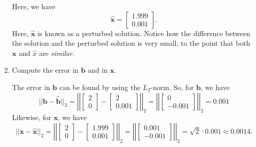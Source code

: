 \documentclass[letterpaper]{article}
\newcommand{\0}{\mathbf{0}}
\renewcommand{\b}{\mathbf{b}}
\newcommand{\x}{\mathbf{x}}
\begin{document}
\begin{mdframed}
\begin{enumerate}
        \begin{mdframed}
            Here, we have \[\hat{\x} = \begin{bmatrix}
                1.999 \\ 0.001
            \end{bmatrix}.\]
            Here, $\hat{\x}$ is known as a perturbed solution. Notice how the difference between the solution and the perturbed solution is very small, to the point that both $\x$ and $\hat{x}$ are \emph{similar}.
        \end{mdframed}

        \item Compute the error in $\b$ and in $\x$.
        \begin{mdframed}
            The error in $\b$ can be found by using the $L_2$-norm. So, for $\b$, we have 
            \[||\b - \hat{\b}||_2 = \left|\left| \begin{bmatrix}
                2 \\ 0
            \end{bmatrix} - \begin{bmatrix}
                2 \\ 0.001
            \end{bmatrix} \right|\right|_2 = \left|\left| \begin{bmatrix}
                0 \\ -0.001
            \end{bmatrix} \right|\right|_2 = 0.001\]
            Likewise, for $\x$, we have 
            \[||\x - \hat{\x}||_2 = \left|\left| \begin{bmatrix}
                2 \\ 0
            \end{bmatrix} - \begin{bmatrix}
                1.999 \\ 0.001
            \end{bmatrix} \right|\right|_2 = \left|\left| \begin{bmatrix}
                0.001 \\ -0.001
            \end{bmatrix} \right|\right|_2 = \sqrt{2} \cdot 0.001 \approx 0.0014.\]
        \end{mdframed}
    \end{enumerate}
\end{mdframed}
\end{document}
